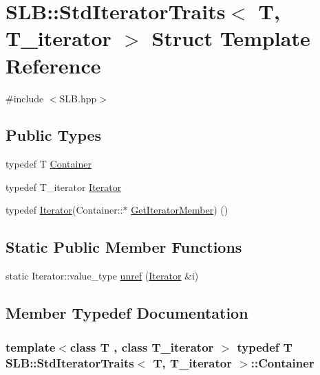 \hypertarget{structSLB_1_1StdIteratorTraits}{}\section{S\+LB\+:\+:Std\+Iterator\+Traits$<$ T, T\+\_\+iterator $>$ Struct Template Reference}
\label{structSLB_1_1StdIteratorTraits}


{\ttfamily \#include $<$S\+L\+B.\+hpp$>$}

\subsection*{Public Types}
\begin{DoxyCompactItemize}
\item 
typedef T \hyperlink{structSLB_1_1StdIteratorTraits_abe613430174beee539070417290928b1}{Container}
\item 
typedef T\+\_\+iterator \hyperlink{structSLB_1_1StdIteratorTraits_a7c66fe3ab42f99b35621b89a195f0dc6}{Iterator}
\item 
typedef \hyperlink{structSLB_1_1StdIteratorTraits_a7c66fe3ab42f99b35621b89a195f0dc6}{Iterator}(Container\+::$\ast$ \hyperlink{structSLB_1_1StdIteratorTraits_a730c8b90b3f54c6af169fb77bc5b5d12}{Get\+Iterator\+Member}) ()
\end{DoxyCompactItemize}
\subsection*{Static Public Member Functions}
\begin{DoxyCompactItemize}
\item 
static Iterator\+::value\+\_\+type \hyperlink{structSLB_1_1StdIteratorTraits_a4db5c508eb740a8af43bb616aa1115f2}{unref} (\hyperlink{structSLB_1_1StdIteratorTraits_a7c66fe3ab42f99b35621b89a195f0dc6}{Iterator} \&i)
\end{DoxyCompactItemize}


\subsection{Member Typedef Documentation}
\subsubsection[{\texorpdfstring{Container}{Container}}]{\setlength{\rightskip}{0pt plus 5cm}template$<$class T , class T\+\_\+iterator $>$ typedef T {\bf S\+L\+B\+::\+Std\+Iterator\+Traits}$<$ T, T\+\_\+iterator $>$\+::{\bf Container}}\hypertarget{structSLB_1_1StdIteratorTraits_abe613430174beee539070417290928b1}{}\label{structSLB_1_1StdIteratorTraits_abe613430174beee539070417290928b1}
